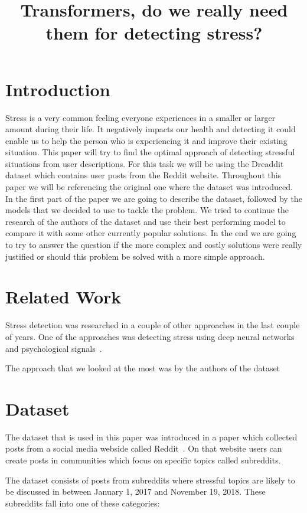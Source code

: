\documentclass[10pt, a4paper]{article}
\title{Transformers, do we really need them for detecting stress?}
\begin{document}
\maketitleabstract

\section{Introduction}

Stress is a very common feeling everyone experiences in a smaller or larger amount during their life.
It negatively impacts our health and detecting it could enable us to help the person who is experiencing it and improve their existing situation.
This paper will try to find the optimal approach of detecting stressful situations from user descriptions.
For this task we will be using the Dreaddit dataset which contains user posts from the Reddit website.
Throughout this paper we will be referencing the original one where the dataset was introduced.
\hfill \break
\hfill \break
In the first part of the paper we are going to describe the dataset, followed by the models that we decided to use to tackle the problem.
We tried to continue the research of the authors of the dataset and use their best performing model to compare it with some other currently popular solutions.
In the end we are going to try to answer the question if the more complex and costly solutions were really justified or should this problem be solved with a more simple approach.

\section{Related Work}
Stress detection was researched in a couple of other approaches in the last couple of years.
One of the approaches was detecting stress using deep neural networks and psychological signals~\citep{stress-neural}.

The approach that we looked at the most was by the authors of the dataset~\citep{turcan-mckeown-2019-dreaddit}

\section{Dataset}

The dataset that is used in this paper was introduced in a paper which collected posts from a social media webside called Reddit~\citep{turcan-mckeown-2019-dreaddit}.
On that website users can create posts in communities which focus on specific topics called subreddits.

The dataset consists of posts from subreddits where stressful topics are likely to be discussed in between January 1, 2017 and November 19, 2018.
These subreddits fall into one of these categories:
\end{document}
